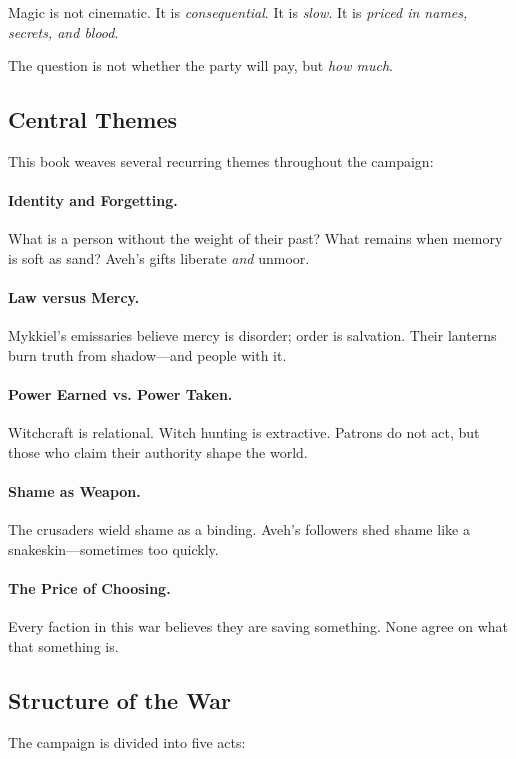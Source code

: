\documentclass[11pt]{book}
\begin{document}
Magic is not cinematic.  
It is \emph{consequential}.  
It is \emph{slow}.  
It is \emph{priced in names, secrets, and blood}.  

The question is not whether the party will pay, but \emph{how much}.

\subsection{Central Themes}
This book weaves several recurring themes throughout the campaign:

\paragraph{Identity and Forgetting.}
What is a person without the weight of their past?  
What remains when memory is soft as sand?  
Aveh's gifts liberate \emph{and} unmoor.

\paragraph{Law versus Mercy.}
Mykkiel's emissaries believe mercy is disorder; order is salvation.  
Their lanterns burn truth from shadow---and people with it.

\paragraph{Power Earned vs. Power Taken.}
Witchcraft is relational.  
Witch hunting is extractive.  
Patrons do not act, but those who claim their authority shape the world.

\paragraph{Shame as Weapon.}
The crusaders wield shame as a binding.  
Aveh's followers shed shame like a snakeskin---sometimes too quickly.

\paragraph{The Price of Choosing.}
Every faction in this war believes they are saving something.  
None agree on what that something is.

\subsection{Structure of the War}
The campaign is divided into five acts:
\end{document}
